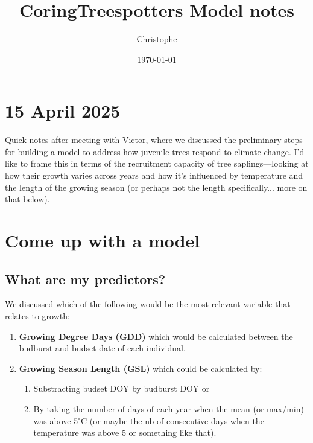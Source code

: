 \documentclass[a4paper,12pt]{article}
\title{CoringTreespotters Model notes}
\author{Christophe}
\date{\today}
\begin{document}
\maketitle

\section*{15 April 2025}
Quick notes after meeting with Victor, where we discussed the preliminary steps for building a model to address how juvenile trees respond to climate change. I’d like to frame this in terms of the recruitment capacity of tree saplings—looking at how their growth varies across years and how it’s influenced by temperature and the length of the growing season (or perhaps not the length specifically... more on that below).

\section{Come up with a model}

\subsection*{What are my predictors?}
We discussed which of the following would be the most relevant variable that relates to growth:
\begin{enumerate}
	\item \textbf{Growing Degree Days (GDD)} which would be calculated between the budburst and budset date of each individual. 
	\item \textbf{Growing Season Length (GSL)} which could be calculated by:
	\begin{enumerate}
		\item Substracting budset DOY by budburst DOY or 
		\item By taking the number of days of each year when the mean (or max/min) was above 5$^{\circ}$C (or maybe the nb of consecutive days when the temperature was above 5 or something like that).
	\end{enumerate}
\end{enumerate}
\end{document}
